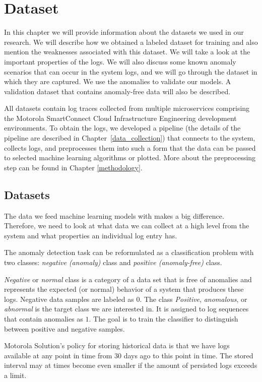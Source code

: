 \chapter{Dataset}
\label{chapter:dataset}

In this chapter we will provide information about the datasets we used in our research. We will describe how we obtained a labeled dataset for training and also mention the weaknesses associated with this dataset. We will take a look at the important properties of the logs. 
We will also discuss some known anomaly scenarios that can occur in the system logs, and we will go through the dataset in which they are captured. 
We use the anomalies to validate our models. A validation dataset that contains anomaly-free data will also be described. 

All datasets contain log traces collected from multiple microservices comprising the Motorola SmartConnect Cloud Infrastructure Engineering development environments.
To obtain the logs, we developed a pipeline (the details of the pipeline are described in Chapter~\ref{data_collection}) that connects to the system, collects logs, and preprocesses them into such a form that the data can be passed to selected machine learning algorithms or plotted.
More about the preprocessing step can be found in Chapter \ref{methodology}.

\section{Datasets}
\label{dataset}
The data we feed machine learning models with makes a big difference. Therefore, we need to look at what data we can collect at a high level from the system and what properties an individual log entry has.

The anomaly detection task can be reformulated as a classification problem with two classes: \textit{negative (anomaly)} class and \textit{positive (anomaly-free)} class. 

\textit{Negative} or \textit{normal} class is a category of a data set that is free of anomalies and represents the expected (or normal) behavior of a system that produces these logs. Negative data samples are labeled as $0$. The class \textit{Positive}, \textit{anomalous}, or \textit{abnormal} is the target class we are interested in. It is assigned to log sequences that contain anomalies as $1$. The goal is to train the classifier to distinguish between positive and negative samples.

Motorola Solution's policy for storing historical data is that we have logs available at any point in time from $30$ days ago to this point in time. The stored interval may at times become even smaller if the amount of persisted logs exceeds a limit.

